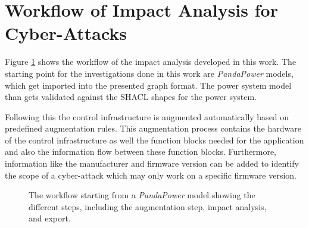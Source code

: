 \section{Workflow of Impact Analysis for Cyber-Attacks}

Figure \ref{fig:errolflow} shows the workflow of the impact analysis developed in this work.
The starting point for the investigations done in this work are \textit{PandaPower}\cite{pandapower_2018} models, which get imported into the presented graph format.
The power system model than gets validated against the \ac{SHACL} shapes for the power system.

Following this the control infrastructure is augmented automatically based on predefined augmentation rules.
This augmentation process contains the hardware of the control infrastructure as well the function blocks needed for the application and also the information flow between these function blocks.
Furthermore, information like the manufacturer and firmware version can be added to identify the scope of a cyber-attack which may only work on a specific firmware version.
\begin{figure}[H]

    \centering
    \caption{The workflow starting from a \textit{PandaPower} model showing the different steps, including the augmentation step, impact analysis, and export.}
    \label{fig:errolflow}
\end{figure}

